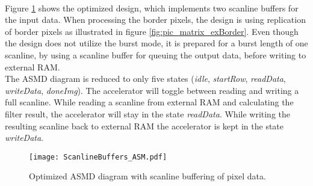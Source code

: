 \paragraph*{}
Figure \ref{fig:ASMD_ScanlineBuffers} shows the optimized design, which implements two scanline buffers for the input data. When processing the border pixels, the design is using replication of border pixels as illustrated in figure \ref{fig:pic_matrix_exBorder}. 
Even though the design does not utilize the burst mode, it is prepared for a burst length of one scanline, by using a scanline buffer for queuing the output data, before writing to external RAM.\\
The ASMD diagram is reduced to only five states (\emph{idle}, \emph{startRow}, \emph{readData}, \emph{writeData}, \emph{doneImg}). 
The accelerator will toggle between reading and writing a full scanline. While reading a scanline from external RAM and calculating the filter result, the accelerator will stay in the state \emph{readData}. While writing the resulting scanline back to external RAM the accelerator is kept in the state \emph{writeData}.

\begin{figure}[H]
	\centering
	\texttt{[image: ScanlineBuffers\_ASM.pdf]}
	\caption{Optimized ASMD diagram with scanline buffering of pixel data.}
	\label{fig:ASMD_ScanlineBuffers}
\end{figure}
